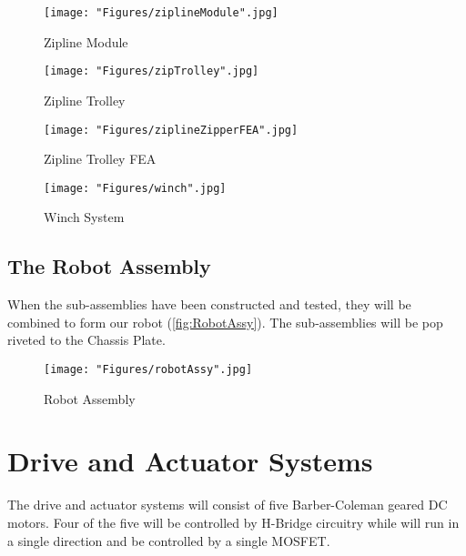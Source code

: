 \documentclass[11pt, oneside]{article} %
\begin{document}
		\begin{figure}[h]
			\centering
			\begin{minipage}[t]{.5\textwidth}
				\centering
				\texttt{[image: "Figures/ziplineModule".jpg]}
				\caption[Zipline Module]{Zipline Module}
				\label{fig:zipModule}
			\end{minipage}%
			\begin{minipage}[t]{.5\textwidth}
				\centering
				\texttt{[image: "Figures/zipTrolley".jpg]}
				\caption[Zipline Trolley]{Zipline Trolley}
				\label{fig:zipTrolley}
			\end{minipage}
		\end{figure}	
		
		\begin{figure}[h]
			\centering
			\begin{minipage}[t]{.5\textwidth}
				\centering
				\texttt{[image: "Figures/ziplineZipperFEA".jpg]}
				\caption[Zipline Trolley FEA]{Zipline Trolley FEA}
				\label{fig:zipFEA}
			\end{minipage}%
			\begin{minipage}[t]{.5\textwidth}
				\centering
				\texttt{[image: "Figures/winch".jpg]}
				\caption[WinchSystem]{Winch System}
				\label{fig:winch}
			\end{minipage}
		\end{figure}
	
	\newpage
	\subsection{The Robot Assembly}
	When the sub-assemblies have been constructed and tested, they will be combined to form our robot (\autoref{fig:RobotAssy}). The sub-assemblies will be pop riveted to the Chassis Plate.
	
	\begin{figure}[h]
		\centering
		\texttt{[image: "Figures/robotAssy".jpg]}
		\caption[Robot Assembly]{Robot Assembly}
		\label{fig:RobotAssy}
	\end{figure}
	
	\newpage
	
\section{Drive and Actuator Systems}
The drive and actuator systems will consist of five Barber-Coleman geared DC motors. Four of the five will be controlled by H-Bridge circuitry while will run in a single direction and be controlled by a single MOSFET.
\end{document}
